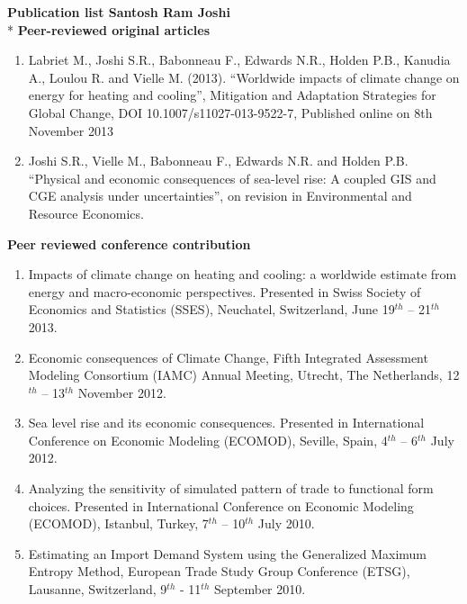 \textbf{Publication list Santosh Ram Joshi}\\*
\textbf{Peer-reviewed original articles}
\begin{enumerate}
\item Labriet M., Joshi S.R., Babonneau F., Edwards N.R., Holden P.B., Kanudia A.,  Loulou R. and Vielle M. (2013). “Worldwide impacts of climate change on energy for heating and cooling”, Mitigation and Adaptation Strategies for Global Change, DOI 10.1007/s11027-013-9522-7, Published online on 8th November 2013
\item Joshi S.R., Vielle M., Babonneau F., Edwards N.R. and Holden P.B. “Physical and economic consequences of sea-level rise: A coupled GIS and CGE analysis under uncertainties”, on revision in Environmental and Resource Economics.
\end{enumerate}
\textbf{Peer reviewed conference contribution}
\begin{enumerate}
\item Impacts of climate change on heating and cooling: a worldwide estimate from energy and macro-economic perspectives. Presented in Swiss Society of Economics and Statistics (SSES), Neuchatel, Switzerland, June 19$^{th}$ – 21$^{th}$ 2013.
\item Economic consequences of Climate Change, Fifth Integrated Assessment Modeling Consortium (IAMC) Annual Meeting, Utrecht, The Netherlands, 12$^{th}$ – 13$^{th}$ November 2012.
\item Sea level rise and its economic consequences. Presented in International Conference on Economic Modeling (ECOMOD), Seville, Spain, 4$^{th}$ – 6$^{th}$ July 2012.
\item Analyzing the sensitivity of simulated pattern of trade to functional form choices. Presented in International Conference on Economic Modeling (ECOMOD), Istanbul, Turkey,  7$^{th}$ – 10$^{th}$ July 2010.
\item Estimating an Import Demand System using the Generalized Maximum Entropy Method,
European Trade Study Group Conference (ETSG), Lausanne, Switzerland, 9$^{th}$ - 11$^{th}$ September 2010.
\end{enumerate}
